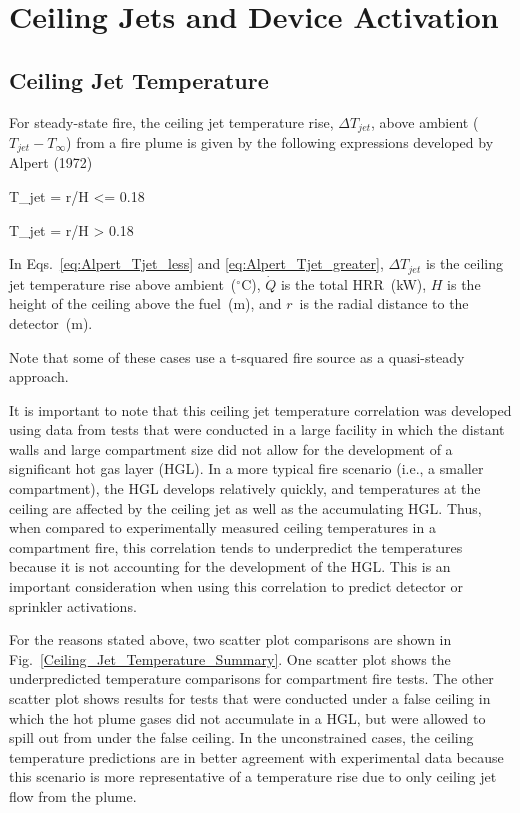 \chapter{Ceiling Jets and Device Activation}

\section{Ceiling Jet Temperature}

For steady-state fire, the ceiling jet temperature rise, $\Delta T_{jet}$, above ambient ($T_{jet} - T_\infty$) from a fire plume is given by the following expressions developed by Alpert (1972)

\be
\Delta T_{jet} =   r/H <= 0.18
\label{eq:Alpert_Tjet_less}
\ee

\be
\Delta T_{jet} =   r/H > 0.18
\label{eq:Alpert_Tjet_greater}
\ee

In Eqs.~\ref{eq:Alpert_Tjet_less} and \ref{eq:Alpert_Tjet_greater}, $\Delta T_{jet}$ is the ceiling jet temperature rise above ambient~($^\circ$C), $\dot Q$ is the total HRR~(kW), $H$ is the height of the ceiling above the fuel~(m), and $r$~is the radial distance to the detector~(m).

Note that some of these cases use a t-squared fire source as a quasi-steady approach.

It is important to note that this ceiling jet temperature correlation was developed using data from tests that were conducted in a large facility in which the distant walls and large compartment size did not allow for the development of a significant hot gas layer (HGL). In a more typical fire scenario (i.e., a smaller compartment), the HGL develops relatively quickly, and temperatures at the ceiling are affected by the ceiling jet as well as the accumulating HGL. Thus, when compared to experimentally measured ceiling temperatures in a compartment fire, this correlation tends to underpredict the temperatures because it is not accounting for the development of the HGL. This is an important consideration when using this correlation to predict detector or sprinkler activations.

For the reasons stated above, two scatter plot comparisons are shown in Fig.~\ref{Ceiling_Jet_Temperature_Summary}. One scatter plot shows the underpredicted temperature comparisons for compartment fire tests. The other scatter plot shows results for tests that were conducted under a false ceiling in which the hot plume gases did not accumulate in a HGL, but were allowed to spill out from under the false ceiling. In the unconstrained cases, the ceiling temperature predictions are in better agreement with experimental data because this scenario is more representative of a temperature rise due to only ceiling jet flow from the plume.

